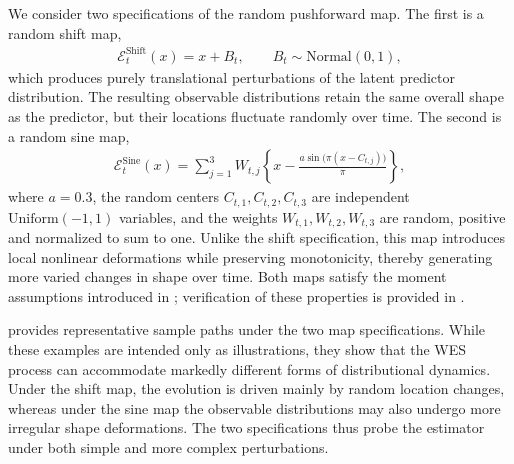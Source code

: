 \documentclass[a4paper, 11pt]{article}
\newcommand{\T}{\mathcal E}
\theoremstyle{definition}
\begin{document}
We consider two specifications of the random pushforward map. 
The first is a random shift map,
\begin{align}
    \T_t^{\mathrm{Shift}}(x) = x + B_t, \qquad B_t \sim \mathrm{Normal}(0,1),
\end{align}
which produces purely translational perturbations of the latent predictor distribution. 
The resulting observable distributions retain the same overall shape as the predictor, but their locations fluctuate randomly over time. 
The second is a random sine map,
\begin{align}
    \T_t^{\mathrm{Sine}}(x) = \sum_{j=1}^3 W_{t,j}\left\{x - \frac{a\sin\bigl(\pi(x-C_{t,j})\bigr)}{\pi}\right\},
\end{align}
where $a=0.3$, the random centers $C_{t,1},C_{t,2},C_{t,3}$ are independent $\mathrm{Uniform}(-1,1)$ variables, and the weights $W_{t,1},W_{t,2},W_{t,3}$ are random, positive and normalized to sum to one. 
Unlike the shift specification, this map introduces local nonlinear deformations while preserving monotonicity, thereby generating more varied changes in shape over time. 
Both maps satisfy the moment assumptions introduced in ; verification of these properties is provided in .

 provides representative sample paths under the two map specifications. 
While these examples are intended only as illustrations, they show that the WES process can accommodate markedly different forms of distributional dynamics. 
Under the shift map, the evolution is driven mainly by random location changes, whereas under the sine map the observable distributions may also undergo more irregular shape deformations. 
The two specifications thus probe the estimator under both simple and more complex perturbations.
\end{document}
